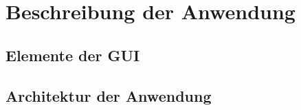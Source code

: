 \chapter{Beschreibung der Anwendung} %
\section{Elemente der GUI} %
\section{Architektur der Anwendung} %